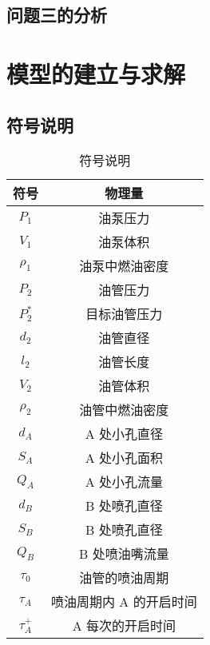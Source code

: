 \documentclass[18pt]{ctexart}
\begin{document}
\subsection{问题三的分析}
\newpage
\section{模型的建立与求解}
\subsection{符号说明}


\begin{table}[!ht]
    \begin{minipage}{\textwidth}
        \begin{minipage}[t]{0.5\textwidth}
        \centering
        \caption{符号说明}
        \begin{tabular}{cc}
        \toprule
        符号             & 物理量           \\
        \midrule
        $P_1$          & 油泵压力          \\
        $V_1$          & 油泵体积          \\
        $\rho_1$       & 油泵中燃油密度       \\
        $P_2$          & 油管压力          \\
        $P_2^*$        & 目标油管压力        \\
        $d_2$          & 油管直径          \\
        $l_2$          & 油管长度          \\
        $V_2$          & 油管体积          \\
        $\rho_2$       & 油管中燃油密度       \\
        $d_A$          & A 处小孔直径       \\
        $S_A$          & A 处小孔面积       \\
        $Q_A$          & A 处小孔流量       \\
        $d_B$          & B 处喷孔直径       \\
        $S_B$          & B 处喷孔直径       \\
        $Q_B$          & B 处喷油嘴流量      \\
        $\tau_0$       & 油管的喷油周期       \\
        $\tau_A$       & 喷油周期内 A 的开启时间 \\
        $\tau_A^+$     & A 每次的开启时间     \\

\end{tabular}
\end{minipage}
\end{minipage}
\end{table}
\end{document}
